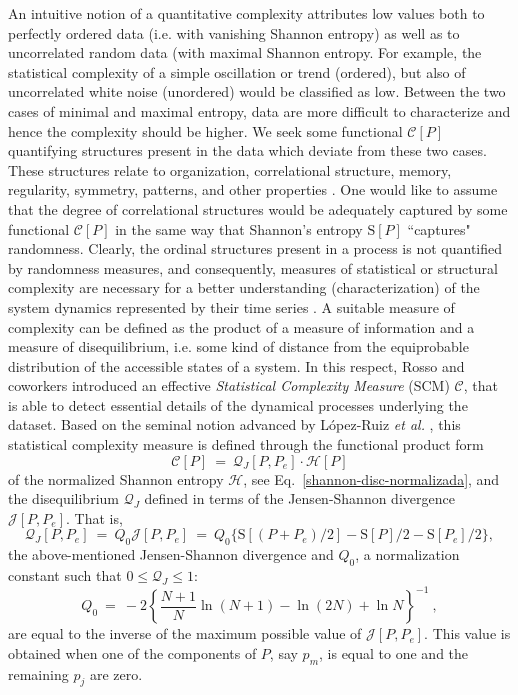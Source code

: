 An intuitive notion of a quantitative complexity attributes low values both to perfectly ordered data (i.e. with vanishing Shannon entropy) as well as to uncorrelated random data (with maximal Shannon entropy.
For example, the statistical complexity of a simple oscillation or trend (ordered), but also of uncorrelated white noise (unordered) would be classified as low.
Between the two cases of minimal and maximal entropy, data are more difficult to characterize and hence the complexity should be higher.
We seek some functional ${\mathcal C} [P]$ quantifying structures present in the data which deviate from these two cases.
These structures relate to organization, correlational structure, memory, regularity, symmetry, patterns, and other properties \cite{Feldman2008}.
One would like to assume that the degree of correlational structures would be adequately captured by some functional ${\mathcal C} [P]$ in the same way that Shannon's entropy ${\mathrm S}[P]$ \cite{Shannon1948} ``captures" randomness.
Clearly, the ordinal structures present in a process is not quantified by randomness measures, and consequently, measures of statistical or structural complexity are necessary for a better understanding (characterization) of the system dynamics represented by their time series \cite{Crutchfield1998}. 
A suitable measure of complexity can be defined as the product of a measure of information and a measure of
disequilibrium, i.e. some kind of distance from the equiprobable distribution of the accessible states of 
a system. 
In this respect, Rosso and coworkers \cite{Lamberti2004} introduced an effective {\it Statistical Complexity Measure\/} (SCM) ${\mathcal C}$, that is able to detect essential details of the dynamical processes underlying the dataset.
Based on the seminal notion advanced by L\'opez-Ruiz {\it et al.} \cite{LMC1995}, this statistical complexity measure\cite{Martin2003,Lamberti2004} is defined through the functional product form
\begin{equation}
{\mathcal C}[P] ~=~ {\mathcal Q}_{J}[P,P_e] \cdot {\mathcal H}[P]
\label{complexity}
\end{equation}
of the normalized Shannon entropy ${\mathcal H}$, see Eq.~\eqref{shannon-disc-normalizada}, and the disequilibrium ${\mathcal Q}_{J}$ defined in terms of the Jensen-Shannon divergence ${\mathcal J}[ P, P_e]$.
That is,
\begin{equation}
\label{disequilibrium}
{\mathcal Q}_{J} [ P, P_e] ~=~ Q_{0} {\mathcal J}[ P, P_e] ~=~ 
Q_{0} \{ {\mathrm S}[(P + P_e)/2 ] - {\mathrm S}[ P ]/2 - {\mathrm S}[P_e]/2\},
\end{equation}
the above-mentioned Jensen-Shannon divergence and $Q_0$, a normalization constant such that $0 \leq {\mathcal Q}_{J} \leq 1$:
\begin{equation}
Q_0 ~=~ -2 \left\{  {\frac{N+1}{N}}  \ln (N+1) - \ln (2N)  +  \ln N \right\}^{-1} \ ,
\label{q0-jensen-1}
\end{equation}
are equal to the inverse of the maximum possible value of ${\mathcal J} [P,P_e]$.
This value is obtained when one of the components of $P$, say $p_m$, is equal to one and the remaining $p_j$ are zero.

